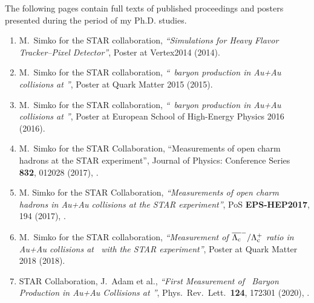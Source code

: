 The following pages contain full texts of published proceedings and posters presented during the period of my Ph.D. studies.

\begin{enumerate}
 \item M.\ Simko for the STAR collaboration, \emph{``Simulations for Heavy Flavor Tracker--Pixel Detector''}, Poster at Vertex2014 (2014).
 \item M.\ Simko for the STAR collaboration, \emph{``\Lambdac\ baryon production in Au+Au collisions at \snnFull''}, Poster at Quark Matter 2015 (2015).
 \item M.\ Simko for the STAR collaboration, \emph{``\Lambdac\ baryon production in Au+Au collisions at \snnFull''}, Poster at European School of High-Energy Physics 2016 (2016).
 \item M.\ Simko for the STAR Collaboration, “Measurements of open charm hadrons at the
STAR experiment”, Journal of Physics: Conference Series \textbf{832}, 012028 (2017), \cite{HotQuarksProceedings}.
 \item M. Simko for the STAR Collaboration, \emph{“Measurements of open charm hadrons in
Au+Au collisions at the STAR experiment”}, PoS \textbf{EPS-HEP2017}, 194 (2017), \cite{EPSHEPproceedings}.
 \item M.\ Simko for the STAR collaboration, \emph{``Measurement of $\overline{{\Lambda_\text{c}}}^- / {\Lambda_\text{c}^+}$ ratio in Au+Au collisions at \snnFull\ with the STAR experiment''}, Poster at Quark Matter 2018 (2018).
 \item STAR Collaboration, J.\ Adam et al., \emph{``First Measurement of \Lambdac\ Baryon Production in Au+Au Collisions at \snnFull''}, Phys.\ Rev.\ Lett.\ \textbf{124}, 172301 (2020), \cite{LambdacPaper}.
\end{enumerate}


\newpage
\cleardoublepage



\newpage
\thispagestyle{empty}\rule{0pt}{0pt}
\newpage



\newpage
\thispagestyle{empty}\rule{0pt}{0pt}
\newpage



\newpage
\thispagestyle{empty}\rule{0pt}{0pt}
\newpage



% 
% 
\newpage
\thispagestyle{empty}\rule{0pt}{0pt}
\newpage


\newpage



\newpage
\thispagestyle{empty}\rule{0pt}{0pt}
\newpage



